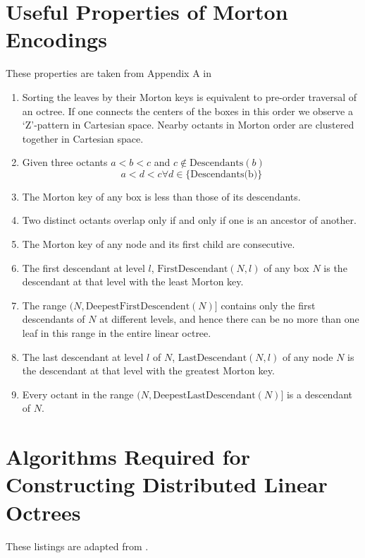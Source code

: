 \section{Useful Properties of Morton Encodings}

These properties are taken from Appendix A in \cite{sundar2008bottom}

\begin{enumerate}
    \item Sorting the leaves by their Morton keys is equivalent to pre-order traversal of an octree. If one connects the centers of the boxes in this order we observe a `Z'-pattern in Cartesian space. Nearby octants in Morton order are clustered together in Cartesian space.
    \item Given three octants $a < b < c$ and $c \notin \text{Descendants}(b)$
    \[
      a < d < c \forall d \in \{ \text{Descendants(b)} \}
    \]
    \item The Morton key of any box is less than those of its descendants.
    \item Two distinct octants overlap only if and only if one is an ancestor of another.
    \item The Morton key of any node and its first child are consecutive.
    \item The first descendant at level $l$, $\text{FirstDescendant}(N, l)$ of any box $N$ is the descendant at that level with the least Morton key.
    \item The range $(N, \text{DeepestFirstDescendent}(N)]$ contains only the first descendants of $N$ at different levels, and hence there can be no more than one leaf in this range in the entire linear octree.
    \item The last descendant at level $l$ of $N$, $\text{LastDescendant}(N, l)$ of any node $N$ is the descendant at that level with the greatest Morton key.
    \item Every octant in the range $(N, \text{DeepestLastDescendant}(N)]$ is a descendant of $N$.
\end{enumerate}


\section{Algorithms Required for Constructing Distributed Linear Octrees}

These listings are adapted from \cite{sundar2008bottom}.

